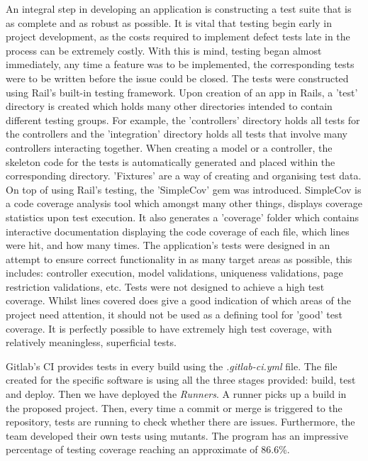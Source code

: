 \documentclass{l3proj}
\begin{document}
An integral step in developing an application is constructing a test suite that is as complete and as robust as possible. It is vital that testing begin early in project development, as the costs required to implement defect tests late in the process can be extremely costly. With this is mind, testing began almost immediately, any time a feature was to be implemented, the corresponding tests were to be written before the issue could be closed. The tests were constructed using Rail's built-in testing framework. Upon creation of an app in Rails, a 'test' directory is created which holds many other directories intended to contain different testing groups. For example, the 'controllers' directory holds all tests for the controllers and the 'integration' directory holds all tests that involve many controllers interacting together. When creating a model or a controller, the skeleton code for the tests is automatically generated and placed within the corresponding directory. 'Fixtures' are a way of creating and organising test data. On top of using Rail's testing, the 'SimpleCov' gem was introduced. SimpleCov is a code coverage analysis tool which amongst many other things, displays coverage statistics upon test execution. It also generates a 'coverage' folder which contains interactive documentation displaying the code coverage of each file, which lines were hit, and how many times. The application's tests were designed in an attempt to ensure correct functionality in as many target areas as possible, this includes: controller execution, model validations, uniqueness validations, page restriction validations, etc. Tests were not designed to achieve a high test coverage. Whilst lines covered does give a good indication of which areas of the project need attention, it should not be used as a defining tool for 'good' test coverage. It is perfectly possible to have extremely high test coverage, with relatively meaningless, superficial tests.


Gitlab's CI provides tests in every build using the \textit{.gitlab-ci.yml} file. The file created for the specific software is using all the three stages provided: build, test and deploy. Then we have deployed the \textit{Runners}. A runner picks up a build in the proposed project. Then, every time a commit or merge is triggered to the repository, tests are running to check whether there are issues. Furthermore, the team developed their own tests using mutants. The program has an impressive percentage of testing coverage reaching an approximate of 86.6\%.
\end{document}

